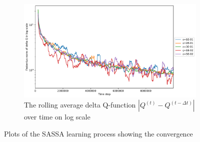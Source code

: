 \documentclass{article}
\begin{document}
\begin{figure}
\begin{subfigure}{\textwidth}
    \centering
    \includegraphics[width=.8\linewidth]{sassa_norm_delta_q_log.pdf}
    \caption{The rolling average delta Q-function $|Q^{(t)} - Q^{(t-\Delta t)}|$ over time on log scale}
    \label{fig:sassa-delta-q-log}
  \end{subfigure}
  \caption{Plots of the SASSA learning process showing the convergence}
\end{figure}
\end{document}
